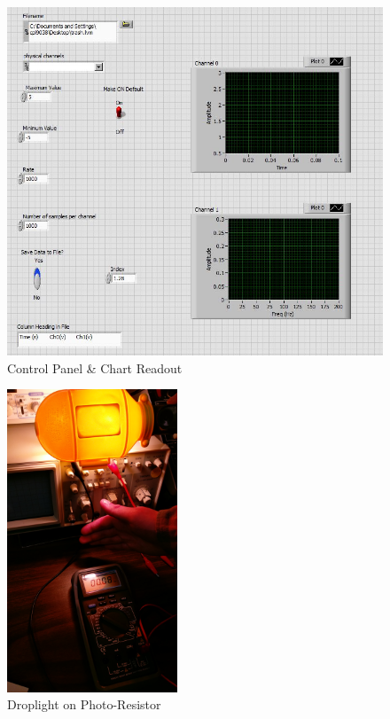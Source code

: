 \documentclass[12pt]{article}
\begin{document}
\begin{figure}[h!] %
   \centering
   \includegraphics[width=5in]{Lab5FrontPanel.JPG} 
   \caption{Control Panel \& Chart Readout}
   \label{fig:example}
\end{figure}

\newpage
 
\begin{figure}[h!] %
   \centering
   \includegraphics[width=2in]{droplight_resistance.jpg} 
   \caption{Droplight on Photo-Resistor}
   \label{fig:example}
\end{figure}
\end{document}
